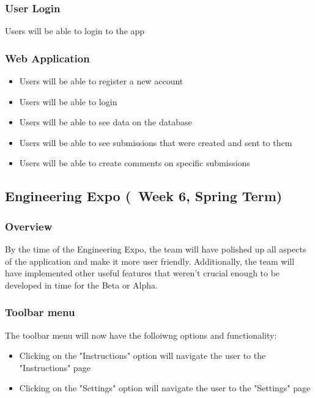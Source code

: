 \documentclass[onecolumn, draftclsnofoot,10pt, compsoc]{IEEEtran}
\begin{document}
\subsubsection{User Login}
Users will be able to login to the app

\subsubsection{Web Application}
\begin{itemize}
\item Users will be able to register a new account
\item Users will be able to login
\item Users will be able to see data on the database
\item Users will be able to see submissions that were created and sent to them
\item Users will be able to create comments on specific submissions
\end{itemize}


\subsection{Engineering Expo (~Week 6, Spring Term)}
\subsubsection{Overview}
By the time of the Engineering Expo, the team will have polished up all aspects of the application and make it more user friendly. Additionally, the team will have implemented other useful features that weren't crucial enough to be developed in time for the Beta or Alpha.

\subsubsection{Toolbar menu}
The toolbar menu will now have the folloiwng options and functionality:
\begin{itemize}
\item Clicking on the "Instructions" option will navigate the user to the "Instructions" page
\item Clicking on the "Settings" option will navigate the user to the "Settings" page
\end{itemize}
\end{document}
